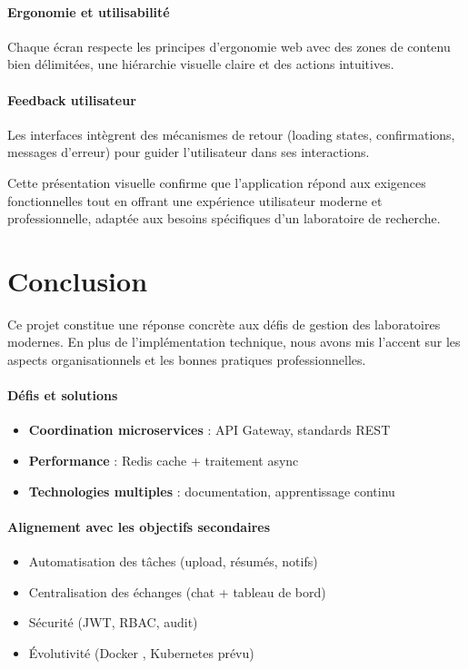 \documentclass[12pt]{rapportPfe}
\begin{document}
\paragraph{Ergonomie et utilisabilité}
Chaque écran respecte les principes d'ergonomie web avec des zones de contenu bien délimitées, une hiérarchie visuelle claire et des actions intuitives.

\paragraph{Feedback utilisateur}
Les interfaces intègrent des mécanismes de retour (loading states, confirmations, messages d'erreur) pour guider l'utilisateur dans ses interactions.

Cette présentation visuelle confirme que l'application répond aux exigences fonctionnelles tout en offrant une expérience utilisateur moderne et professionnelle, adaptée aux besoins spécifiques d'un laboratoire de recherche.


\section{Conclusion}
Ce projet constitue une réponse concrète aux défis de gestion des laboratoires modernes. En plus de l'implémentation technique, nous avons mis l'accent sur les aspects organisationnels et les bonnes pratiques professionnelles.

\paragraph{Défis et solutions}
\begin{itemize}
    \item \textbf{Coordination microservices} : API Gateway, standards REST
    \item \textbf{Performance } : Redis cache + traitement async
    \item \textbf{Technologies multiples} : documentation, apprentissage continu
\end{itemize}

\paragraph{Alignement avec les objectifs secondaires}
\begin{itemize}
    \item Automatisation des tâches (upload, résumés, notifs)
    \item Centralisation des échanges (chat + tableau de bord)
    \item Sécurité (JWT, RBAC, audit)
    \item Évolutivité (Docker , Kubernetes prévu)
\end{itemize}
\end{document}
